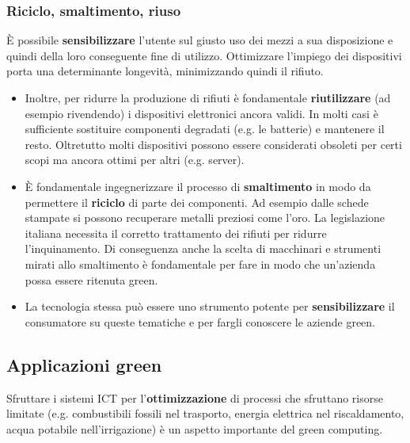 \subsubsection{Riciclo, smaltimento, riuso}
È possibile \textbf{sensibilizzare} l'utente sul giusto uso dei mezzi a sua disposizione e quindi della loro conseguente fine di utilizzo. Ottimizzare l'impiego dei dispositivi porta una determinante longevità, minimizzando quindi il rifiuto.
\begin{itemize}
	\item Inoltre, per ridurre la produzione di rifiuti è fondamentale \textbf{riutilizzare} (ad esempio rivendendo) i dispositivi elettronici ancora validi. In molti casi è sufficiente sostituire componenti degradati (e.g. le batterie) e mantenere il resto. Oltretutto molti dispositivi possono essere considerati obsoleti per certi scopi ma ancora ottimi per altri (e.g. server).
	\item È fondamentale ingegnerizzare il processo di \textbf{smaltimento} in modo da permettere il \textbf{riciclo} di parte dei componenti. Ad esempio dalle schede stampate si possono recuperare metalli preziosi come l'oro. La legislazione italiana necessita il corretto trattamento dei rifiuti per ridurre l'inquinamento. Di conseguenza anche la scelta di macchinari e strumenti mirati allo smaltimento è fondamentale per fare in modo che un'azienda possa essere ritenuta green.
	\item La tecnologia stessa può essere uno strumento potente per \textbf{sensibilizzare} il consumatore su queste tematiche e per fargli conoscere le aziende green.
\end{itemize}
\subsection{Applicazioni green}
Sfruttare i sistemi ICT per l'\textbf{ottimizzazione} di processi che sfruttano risorse limitate (e.g. combustibili fossili nel trasporto, energia elettrica nel riscaldamento, acqua potabile nell'irrigazione) è un aspetto importante del green computing.